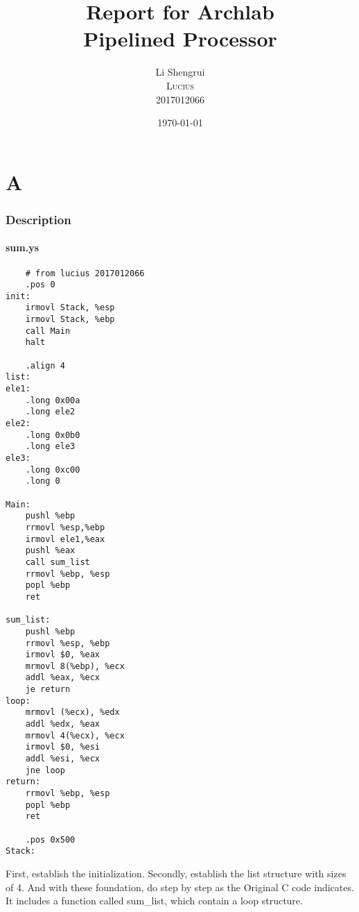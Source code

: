 \documentclass{article}
\title{Report for Archlab \\ Pipelined Processor} %
\author{Li Shengrui \\ \textsc{Lucius} \\2017012066} %
\date{\today} %
\begin{document}
\maketitle %


\part{A}
\section{Description}
\subsection{sum.ys}
\begin{lstlisting}
    # from lucius 2017012066
	.pos 0
init:
	irmovl Stack, %esp
	irmovl Stack, %ebp
	call Main
	halt

	.align 4
list:
ele1:
	.long 0x00a
	.long ele2
ele2:
	.long 0x0b0
	.long ele3
ele3:
	.long 0xc00
	.long 0

Main:
	pushl %ebp
	rrmovl %esp,%ebp
	irmovl ele1,%eax
	pushl %eax
	call sum_list
	rrmovl %ebp, %esp
	popl %ebp
	ret

sum_list:
	pushl %ebp
	rrmovl %esp, %ebp
	irmovl $0, %eax
	mrmovl 8(%ebp), %ecx
	addl %eax, %ecx
	je return
loop:
	mrmovl (%ecx), %edx
	addl %edx, %eax
	mrmovl 4(%ecx), %ecx
	irmovl $0, %esi
	addl %esi, %ecx
	jne loop
return:
	rrmovl %ebp, %esp
	popl %ebp
	ret

	.pos 0x500
Stack:
\end{lstlisting}

First, establish the initialization. Secondly, establish the list structure with sizes of 4. And with these foundation, do step by step as the Original C code indicates. It includes a function called sum\_list, which contain a loop structure.
\end{document}

